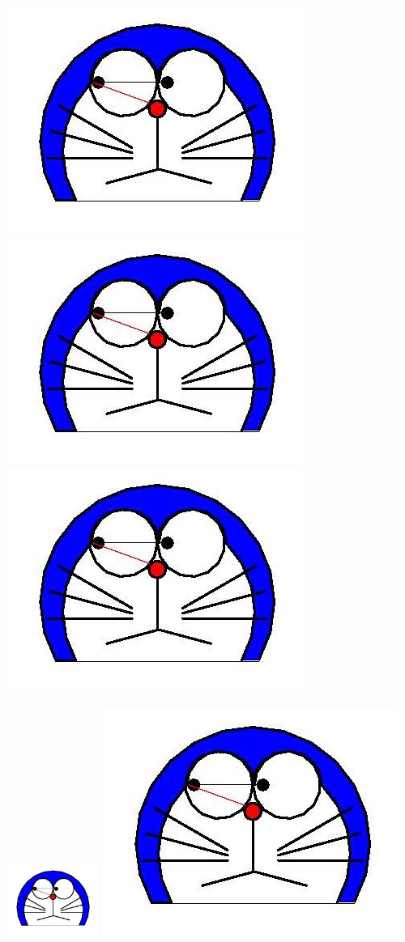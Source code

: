 \documentclass{article}
\begin{document}
\includegraphics[scale=.3]{doraemon1.jpg}
\includegraphics[scale=.5]{doraemon1.jpg}
\includegraphics[scale=.7]{doraemon1.jpg}

\includegraphics[width=3cm]{doraemon1.jpg}
\includegraphics[width=.3\textwidth]{doraemon1.jpg}
\end{document}
